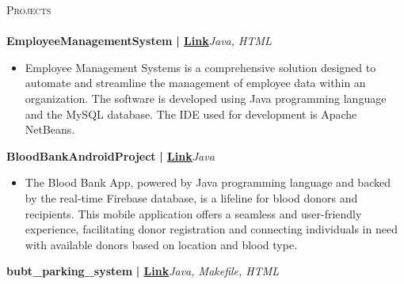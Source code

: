 \documentclass[a4paper]{article}
\newcommand{\lineunder} {
    \vspace*{-8pt} \\
    \hspace*{-18pt} \hrulefill \\
}
\newcommand{\header} [1] {
    {\hspace*{-18pt}\vspace*{9pt} \textsc{#1}}
    \vspace*{-9pt} \lineunder
}
\begin{document}
      \header{Projects}
      \vspace{2mm}
      {\textbf{EmployeeManagementSystem}}\textbf{ | \href{https://github.com/vatiza/EmployeeManagementSystem}{Link}}\hfill{\sl Java, HTML}\\
          \vspace{-3mm}
\begin{itemize} \itemsep -3pt
\item[] Employee Management Systems is a comprehensive solution designed to automate and streamline the management of employee data within an organization. The software is developed using Java programming language and the MySQL database. The IDE used for development is Apache NetBeans.
\end{itemize}
          \vspace*{2mm}
      {\textbf{BloodBankAndroidProject}}\textbf{ | \href{https://github.com/vatiza/BloodBankAndroidProject}{Link}}\hfill{\sl Java}\\
          \vspace{-3mm}
\begin{itemize} \itemsep -3pt
\item[] The Blood Bank App, powered by Java programming language and backed by the real-time Firebase database, is a lifeline for blood donors and recipients. This mobile application offers a seamless and user-friendly experience, facilitating donor registration and connecting individuals in need with available donors based on location and blood type.
\end{itemize}
          \vspace*{2mm}
      {\textbf{bubt\_parking\_system}}\textbf{ | \href{https://github.com/vatiza/bubt\_parking\_system}{Link}}\hfill{\sl Java, Makefile, HTML}\\
\end{document}
